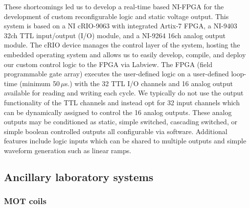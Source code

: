 These shortcomings led us to develop a real-time based NI-FPGA for the development of custom reconfigurable logic and static voltage output.
This system is based on a NI cRIO-9063 with integrated Artix-7 FPGA, a NI-9403 32ch TTL input/output (I/O) module, and a NI-9264 16ch analog output module.
The cRIO device manages the control layer of the system, hosting the embedded operating system and allows us to easily develop, compile, and deploy our custom control logic to the FPGA via Labview.
The FPGA (field programmable gate array) executes the user-defined logic on a user-defined loop-time (minimum 50\,$\mu$s.) with the 32 TTL I/O channels and 16 analog output available for reading and writing each cycle.
We typically do not use the output functionality of the TTL channels and instead opt for 32 input channels which can be dynamically assigned to control the 16 analog outputs.
These analog outputs may be conditioned as static, simple switched, cascading switched, or simple boolean controlled outputs all configurable via software.
Additional features include logic inputs which can be shared to multiple outputs and simple waveform generation such as linear ramps.

\subsection{Ancillary laboratory systems} \label{ssec:misc_sys}
\subsubsection{MOT coils}
%

